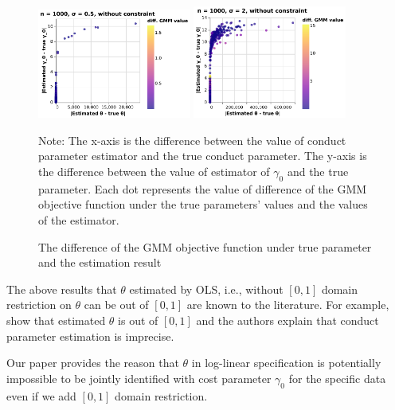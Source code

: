 \documentclass[11pt, a4paper]{article}
\begin{document}
\begin{figure}[!htbp]
  \begin{center}
  \includegraphics[width = 0.45\textwidth]
  {figuretable/diff_gmm_value_loglinear_loglinear_n_1000_sigma_0.5_non_constraint.pdf}
  \includegraphics[width = 0.45\textwidth]
  {figuretable/diff_gmm_value_loglinear_loglinear_n_1000_sigma_2_non_constraint.pdf}
  \caption{The difference of the GMM objective function under true parameter and the estimation result}
  \label{fg:diff_gmm_loglinear_loglinear} 
  \end{center}
  \footnotesize
  Note: The x-axis is the difference between the value of conduct parameter estimator and the true conduct parameter. The y-axis is the difference between the value of estimator of $\gamma_0$ and the true parameter. Each dot represents the value of difference of the GMM objective function under the true parameters' values and the values of the estimator. 
\end{figure} 




The above results that $\theta$ estimated by OLS, i.e., without $[0,1]$ domain restriction on $\theta$ can be out of $[0,1]$ are known to the literature. 
For example, \cite{okazaki2022excess} show that estimated $\theta$ is out of $[0,1]$ and the authors explain that conduct parameter estimation is imprecise.





Our paper provides the reason that $\theta$ in log-linear specification is potentially impossible to be jointly identified with cost parameter $\gamma_0$ for the specific data even if we add $[0,1]$ domain restriction. 
\end{document}
